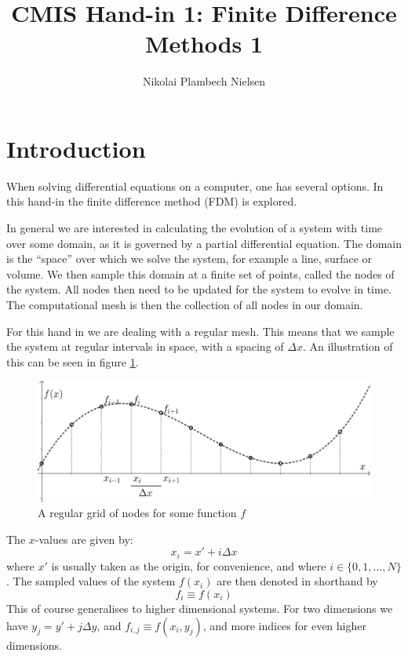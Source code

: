 \documentclass[sigconf]{acmart}
\begin{document}
%
\title{CMIS Hand-in 1: Finite Difference Methods 1}

\author{Nikolai Plambech Nielsen}


\maketitle

\section{Introduction}
When solving differential equations on a computer, one has several options. In this hand-in the finite difference method (FDM) is explored.

In general we are interested in calculating the evolution of a system with time over some domain, as it is governed by a partial differential equation. The domain is the ``space'' over which we solve the system, for example a line, surface or volume. We then sample this domain at a finite set of points, called the nodes of the system. All nodes then need to be updated for the system to evolve in time. The computational mesh is then the collection of all nodes in our domain.

For this hand in we are dealing with a regular mesh. This means that we sample the system at regular intervals in space, with a spacing of $ \Delta x $. An illustration of this can be seen in figure \ref{fig:reg_grid}.
\begin{figure}
	\includegraphics[width=\linewidth]{finite_difference1.png}
	\caption{A regular grid of nodes for some function $ f $}
	\label{fig:reg_grid}
\end{figure}

The $ x $-values are given by:
\begin{equation}\label{key}
	x_i = x' + i \Delta x
\end{equation}
where $ x' $ is usually taken as the origin, for convenience, and where $ i \in \{0,1,...,N\} $. The sampled values of the system $ f(x_i) $ are then denoted in shorthand by
\begin{equation}\label{key}
	f_i \equiv f(x_i)
\end{equation}
This of course generalises to higher dimensional systems. For two dimensions we have $ y_j = y' + j \Delta y$, and $ f_{i,j} \equiv f(x_i, y_j) $, and more indices for even higher dimensions.
\end{document}
